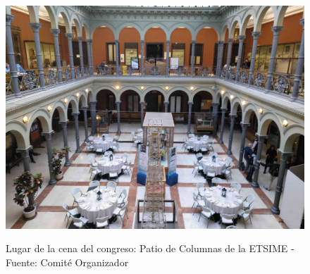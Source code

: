 \documentclass[twoside]{article}
\begin{document}
%
\begin{center}
\begin{figure}
	\centering
		\includegraphics[width=.95\textwidth]{cena}
	\label{fig:CenaCong}
	\caption{Lugar de la cena del congreso: Patio de Columnas de la ETSIME - Fuente: Comité Organizador}
\end{figure}
\end{center}

\end{document}
